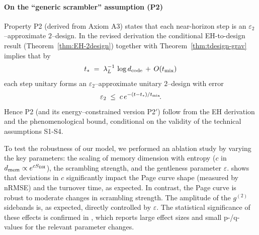 \documentclass[a4paper,11pt]{article}
\theoremstyle{plain}
\theoremstyle{definition}
\theoremstyle{remark}
\begin{document}
\paragraph{On the ``generic scrambler'' assumption (P2)}
Property P2 (derived from Axiom A3) states that each near-horizon step is an $\varepsilon_2$--approximate $2$--design.
In the revised derivation the conditional EH-to-design result (Theorem~\ref{thm:EH-2design}) together with Theorem~\ref{thm:tdesign-grav} implies that by
\[
t_\ast \;=\; \lambda_L^{-1}\,\log d_{\rm code} \,+\, O(t_{\rm mix})
\]
each step unitary forms an $\varepsilon_2$--approximate unitary $2$--design with error
\[
\varepsilon_2 \;\le\; c\,e^{-(t-t_\ast)/t_{\rm mix}}\!.
\]
Hence P2 (and its energy--constrained version P2$'$) follow from the EH derivation and the phenomenological bound, conditional on the validity of the technical assumptions S1-S4.

To test the robustness of our model, we performed an ablation study by varying the key parameters: the scaling of memory dimension with entropy ($c$ in $d_{\rm mem} \propto e^{c S_{\rm BH}}$), the scrambling strength, and the gentleness parameter $\varepsilon$.  shows that deviations in $c$ significantly impact the Page curve shape (measured by nRMSE) and the turnover time, as expected. In contrast, the Page curve is robust to moderate changes in scrambling strength. The amplitude of the $g^{(2)}$ sidebands is, as expected, directly controlled by $\varepsilon$. The statistical significance of these effects is confirmed in , which reports large effect sizes and small p-/q-values for the relevant parameter changes.

\begin{table}[htbp]
\centering
\caption{Ablation study results (mean values over runs). Metrics include residual final entropy, normalized RMSE (nRMSE, defined in ) to the ideal Page envelope, turnover step, and maximum $g^{(2)}$ amplitude.}
\label{tab:ablation}
\vspace{0.5em}
\footnotesize
\setlength{\tabcolsep}{4pt}
\pgfplotstabletypeset{\datatableAblation}
\vspace{0.5em}
\end{table}
\end{document}
